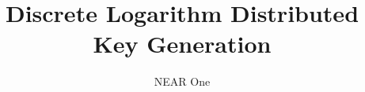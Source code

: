 \documentclass{llncs}
\title{Discrete Logarithm Distributed Key Generation}
\author{NEAR One}
\institute{}
\begin{document}
\let\oldaddcontentsline\addcontentsline
\def\addcontentsline#1#2#3{}

	\maketitle

% 
% 

  \def\addcontentsline#1#2#3{\oldaddcontentsline{#1}{#2}{#3}}
	\onehalfspacing
  \setcounter{tocdepth}{3}
	\tableofcontents
	\singlespacing
	\newpage


	
	
	
	
	
	\printbibliography
\end{document}
